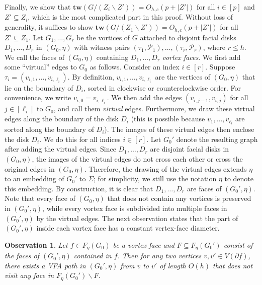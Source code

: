 \documentclass[a4paper,11pt]{article}
\numberwithin{lemma}{section}
\newtheorem{observation}[lemma]{Observation}
\newcommand{\tw}{\mathbf{tw}}
\begin{document}
Finally, we show that $\tw(G/(Z_i \backslash Z')) = O_{h,c}(p+|Z'|)$ for all $i \in [p]$ and $Z' \subseteq Z_i$, which is the most complicated part in this proof.
Without loss of generality, it suffices to show $\tw(G/(Z_1 \backslash Z')) = O_{h,c}(p+|Z'|)$ for all $Z' \subseteq Z_1$.
Let $G_1,\dots,G_r$ be the vortices of $G$ attached to disjoint facial disks $D_1,\dots,D_r$ in $(G_0,\eta)$ with witness pairs $(\tau_1,\mathcal{P}_1),\dots,(\tau_r,\mathcal{P}_r)$, where $r \leq h$.
We call the faces of $(G_0,\eta)$ containing $D_1,\dots,D_r$ \emph{vortex faces}.
We first add some ``virtual'' edges to $G_0$ as follows.
Consider an index $i \in [r]$.
Suppose $\tau_i = (v_{i,1},\dots,v_{i,\ell_i})$.
By definition, $v_{i,1},\dots,v_{i,\ell_i}$ are the vertices of $(G_0,\eta)$ that lie on the boundary of $D_i$, sorted in clockwise or counterclockwise order.
For convenience, we write $v_{i,0} = v_{i,\ell_i}$.
We then add the edges $(v_{i,j-1},v_{i,j})$ for all $j \in [\ell_i]$ to $G_0$, and call them \emph{virtual} edges.
Furthermore, we draw these virtual edges along the boundary of the disk $D_i$ (this is possible because $v_1,\dots,v_{\ell_i}$ are sorted along the boundary of $D_i$).
The images of these virtual edges then enclose the disk $D_i$.
We do this for all indices $i \in [r]$.
Let $G_0'$ denote the resulting graph after adding the virtual edges.
Since $D_1,\dots,D_r$ are disjoint facial disks in $(G_0,\eta)$, the images of the virtual edges do not cross each other or cross the original edges in $(G_0,\eta)$.
Therefore, the drawing of the virtual edges extends $\eta$ to an embedding of $G_0'$ to $\varSigma$; for simplicity, we still use the notation $\eta$ to denote this embedding.
By construction, it is clear that $D_1,\dots,D_r$ are faces of $(G_0',\eta)$.
Note that every face of $(G_0,\eta)$ that does not contain any vortices is preserved in $(G_0',\eta)$, while every vortex face is subdivided into multiple faces in $(G_0',\eta)$ by the virtual edges.
The next observation states that the part of $(G_0',\eta)$ inside each vortex face has a constant vertex-face diameter.

\begin{observation}\label{obs-invortex}
Let $f \in F_\eta(G_0)$ be a vortex face and $F \subseteq F_\eta(G_0')$ consist of the faces of $(G_0',\eta)$ contained in $f$.
Then for any two vertices $v,v' \in V(\partial f)$, there exists a VFA path in $(G_0',\eta)$ from $v$ to $v'$ of length $O(h)$ that does not visit any face in $F_\eta(G_0') \backslash F$.
\end{observation}
\end{document}
